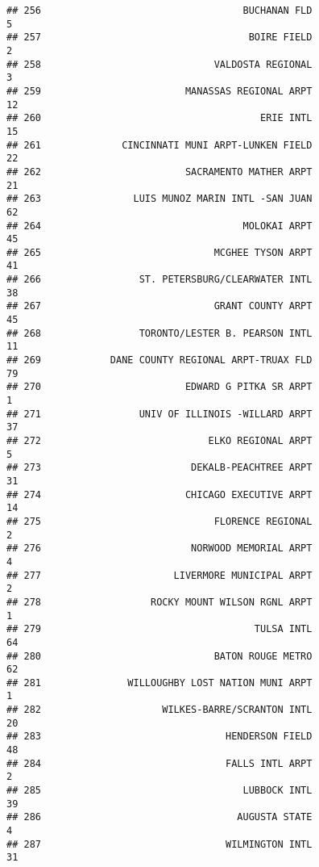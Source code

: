 \documentclass[
]{article}
\begin{document}
\begin{verbatim}
## 256                                   BUCHANAN FLD                           5
## 257                                    BOIRE FIELD                           2
## 258                              VALDOSTA REGIONAL                           3
## 259                         MANASSAS REGIONAL ARPT                          12
## 260                                      ERIE INTL                          15
## 261              CINCINNATI MUNI ARPT-LUNKEN FIELD                          22
## 262                         SACRAMENTO MATHER ARPT                          21
## 263                LUIS MUNOZ MARIN INTL -SAN JUAN                          62
## 264                                   MOLOKAI ARPT                          45
## 265                              MCGHEE TYSON ARPT                          41
## 266                 ST. PETERSBURG/CLEARWATER INTL                          38
## 267                              GRANT COUNTY ARPT                          45
## 268                 TORONTO/LESTER B. PEARSON INTL                          11
## 269            DANE COUNTY REGIONAL ARPT-TRUAX FLD                          79
## 270                         EDWARD G PITKA SR ARPT                           1
## 271                 UNIV OF ILLINOIS -WILLARD ARPT                          37
## 272                             ELKO REGIONAL ARPT                           5
## 273                          DEKALB-PEACHTREE ARPT                          31
## 274                         CHICAGO EXECUTIVE ARPT                          14
## 275                              FLORENCE REGIONAL                           2
## 276                          NORWOOD MEMORIAL ARPT                           4
## 277                       LIVERMORE MUNICIPAL ARPT                           2
## 278                   ROCKY MOUNT WILSON RGNL ARPT                           1
## 279                                     TULSA INTL                          64
## 280                              BATON ROUGE METRO                          62
## 281               WILLOUGHBY LOST NATION MUNI ARPT                           1
## 282                     WILKES-BARRE/SCRANTON INTL                          20
## 283                                HENDERSON FIELD                          48
## 284                                FALLS INTL ARPT                           2
## 285                                   LUBBOCK INTL                          39
## 286                                  AUGUSTA STATE                           4
## 287                                WILMINGTON INTL                          31

\end{verbatim}
\end{document}
